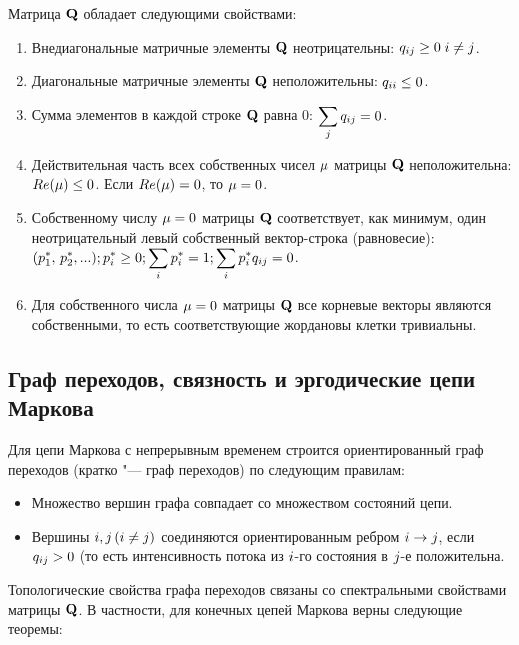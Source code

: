 \documentclass{article}
\begin{document}
Матрица ${\displaystyle \mathbf {Q} }$ обладает следующими свойствами:

\begin{enumerate}
	\item Внедиагональные матричные элементы ${\displaystyle \mathbf {Q} }$ неотрицательны: ${\displaystyle q_{ij}\geq 0\;i\neq j}$.
	\item Диагональные матричные элементы ${\displaystyle \mathbf {Q} }$ неположительны: ${\displaystyle q_{ii}\leq 0}$.
	\item Сумма элементов в каждой строке ${\displaystyle \mathbf {Q} }$ равна 0: ${\displaystyle \sum _{j}q_{ij}=0}$.
	\item Действительная часть всех собственных чисел ${\displaystyle \mu }$  матрицы ${\displaystyle \mathbf {Q} }$ неположительна: ${\displaystyle Re(\mu )\leq 0}$. Если ${\displaystyle Re(\mu )=0}$, то ${\displaystyle \mu =0}$.
	\item Собственному числу ${\displaystyle \mu =0}$ матрицы ${\displaystyle \mathbf {Q} }$ соответствует, как минимум, один неотрицательный левый собственный вектор-строка (равновесие): ${\displaystyle (p_{1}^{*},\,p_{2}^{*},...); p_{i}^{*}\geq 0; \sum _{i}p_{i}^{*}=1; \sum _{i}p_{i}^{*}q_{ij}=0}$.
	\item Для собственного числа ${\displaystyle \mu =0}$ матрицы ${\displaystyle \mathbf {Q} }$ все корневые векторы являются собственными, то есть соответствующие жордановы клетки тривиальны.
\end{enumerate}

\subsection{Граф переходов, связность и эргодические цепи Маркова}
Для цепи Маркова с непрерывным временем строится ориентированный граф переходов (кратко "--- граф переходов) по следующим правилам:

\begin{itemize}
	\item Множество вершин графа совпадает со множеством состояний цепи.
	\item Вершины ${\displaystyle i,j\,(i\neq j)}$ соединяются ориентированным ребром ${\displaystyle i\to j}$, если ${\displaystyle q_{ij}>0}$ (то есть интенсивность потока из ${\displaystyle i}$-го состояния в ${\displaystyle j}$-е положительна.
\end{itemize}

Топологические свойства графа переходов связаны со спектральными свойствами матрицы ${\displaystyle \mathbf {Q} }$. В частности, для конечных цепей Маркова верны следующие теоремы:
\end{document}
